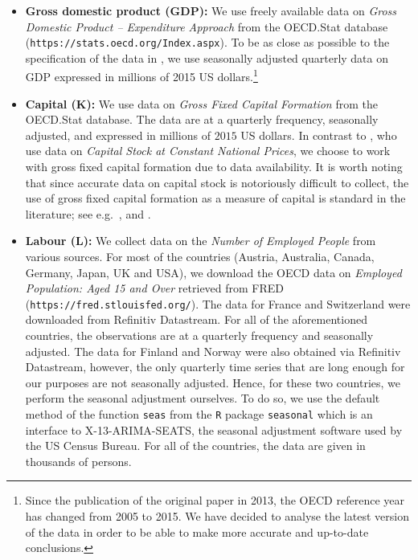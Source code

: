 \documentclass[a4paper,12pt]{article}
\begin{document}
\begin{itemize}[leftmargin=0.5cm]
\item \textbf{Gross domestic product ($\boldsymbol{GDP}$):} We use freely available data on \textit{Gross Domestic Product -- Expenditure Approach} from the OECD.Stat \nocite{OECD} database (\texttt{https://stats.\linebreak oecd.org/Index.aspx}). To be as close as possible to the specification of the data in \cite{Zhang2012}, we use seasonally adjusted quarterly data on GDP expressed in millions of 2015 US dollars.\footnote{Since the publication of the original paper in 2013, the OECD reference year has changed from 2005 to 2015. We have decided to analyse the latest version of the data in order to be able to make more accurate and up-to-date conclusions.} 

\item \textbf{Capital ($\boldsymbol{K}$):} We use data on \textit{Gross Fixed Capital Formation} from the OECD.Stat \nocite{OECD} database. The data are at a quarterly frequency, seasonally adjusted, and expressed in millions of $2015$ US dollars. In contrast to \cite{Zhang2012}, who use data on \textit{Capital Stock at Constant National Prices}, we choose to work with gross fixed capital formation due to data availability. It is worth noting that since accurate data on capital stock is notoriously difficult to collect, the use of gross fixed capital formation as a measure of capital is standard in the literature; see e.g.\ \cite{Sharma1994}, \cite{Lee2002} and \cite{Lee2005}.

\item \textbf{Labour ($\boldsymbol{L}$):} We collect data on the \textit{Number of Employed People} from various sources. For most of the countries (Austria, Australia, Canada, Germany, Japan, UK and USA), we download the OECD data on \textit{Employed Population: Aged 15 and Over} retrieved from FRED (\texttt{https://fred.stlouisfed.org/}). \nocite{OECDempl} The data for France and Switzerland were downloaded from Refinitiv Datastream. For all of the aforementioned countries, the observations are at a quarterly frequency and seasonally adjusted. The data for Finland and Norway were also obtained via Refinitiv Datastream, however, the only quarterly time series that are long enough for our purposes are not seasonally adjusted. Hence, for these two countries, we perform the seasonal adjustment ourselves. To do so, we use the default method of the function \verb|seas| from the \verb|R| package \verb|seasonal| \citep*{Sax2018} which is an interface to X-13-ARIMA-SEATS, the seasonal adjustment software used by the US Census Bureau. 
For all of the countries, the data are given in thousands of persons.


\end{itemize}
\end{document}
